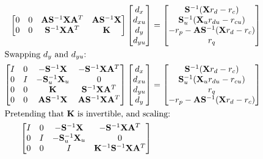 \documentclass[10pt,a4paper]{article}
\begin{document}
\begin{align*}
\begin{bmatrix}
0 & 0 & \mathbf{A}\mathbf{S}^{-1}\mathbf{X}\mathbf{A}^T & \mathbf{A}\mathbf{S}^{-1}\mathbf{X} \\
0 & 0 & \mathbf{S}^{-1}\mathbf{X}\mathbf{A}^T & \mathbf{K}
\end{bmatrix}
\begin{bmatrix}d_x \\ d_{xu} \\ d_y \\ d_{yu}\end{bmatrix} &= 
\begin{bmatrix}
\mathbf{S}^{-1}(\mathbf{X}r_d - r_c) \\
\mathbf{S}_u^{-1}(\mathbf{X}_ur_{du} - r_{cu}) \\
-r_p - \mathbf{A}\mathbf{S}^{-1}(\mathbf{X}r_d - r_c) \\
r_q
\end{bmatrix} \\
\intertext{Swapping $d_y$ and $d_{yu}$:}
\begin{bmatrix}
I & 0 & -\mathbf{S}^{-1}\mathbf{X} & -\mathbf{S}^{-1}\mathbf{X}\mathbf{A}^T \\
0 & I & -\mathbf{S}_u^{-1}\mathbf{X}_u & 0 \\
0 & 0 & \mathbf{K} & \mathbf{S}^{-1}\mathbf{X}\mathbf{A}^T \\
0 & 0 & \mathbf{A}\mathbf{S}^{-1}\mathbf{X} & \mathbf{A}\mathbf{S}^{-1}\mathbf{X}\mathbf{A}^T
\end{bmatrix}
\begin{bmatrix}d_x \\ d_{xu} \\ d_{yu} \\ d_y\end{bmatrix} &= 
\begin{bmatrix}
\mathbf{S}^{-1}(\mathbf{X}r_d - r_c) \\
\mathbf{S}_u^{-1}(\mathbf{X}_ur_{du} - r_{cu}) \\
r_q \\
-r_p - \mathbf{A}\mathbf{S}^{-1}(\mathbf{X}r_d - r_c)
\end{bmatrix} \\
\intertext{Pretending that $\mathbf{K}$ is invertible, and scaling:}
\begin{bmatrix}
I & 0 & -\mathbf{S}^{-1}\mathbf{X} & -\mathbf{S}^{-1}\mathbf{X}\mathbf{A}^T \\
0 & I & -\mathbf{S}_u^{-1}\mathbf{X}_u & 0 \\
0 & 0 & I & \mathbf{K}^{-1}\mathbf{S}^{-1}\mathbf{X}\mathbf{A}^T \\

\end{bmatrix}
\end{align*}
\end{document}
